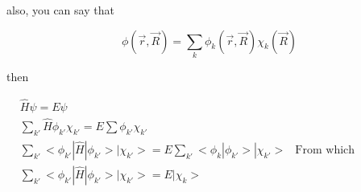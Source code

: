 also, you can say that

$$
    \phi(\vec{r}, \vec{R}) = \sum_k{\phi_k(\vec{r}, \vec{R}) \chi_k({\vec{R}})}
$$

then

\begin{align*}
    &\hat{H} \psi = E \psi &\\
    &\sum_{k'}{\hat{H} \phi_{k'} \chi_{k'}} = E \sum{\phi_{k'} \chi_{k'}} &\\
    &\sum_{k'}{<\phi_{k'}|\hat{H}|\phi_{k'}> |\chi_{k'}}> = E \sum_{k'}{<\phi_{k}|\phi_{k'}> |\chi_{k'}>} & \text{From which Kronecker delta} \\
    &\sum_{k'}{<\phi_{k'}|\hat{H}|\phi_{k'}> |\chi_{k'}}> = E |\chi_{k}> & 
\end{align*}